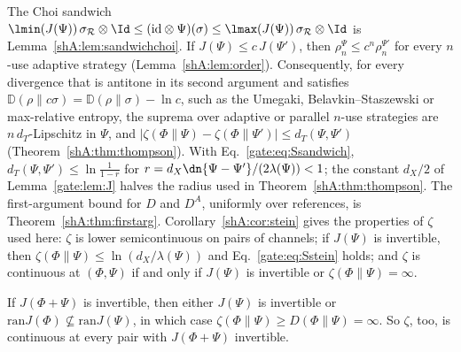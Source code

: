 The Choi sandwich $\lmin(J(\Psi))\,\sigma_{\mathcal R}\otimes\Id\le(\mathrm{id}\otimes\Psi)(\sigma)\le\lmax(J(\Psi))\,\sigma_{\mathcal R}\otimes\Id$ is Lemma~\ref{shA:lem:sandwichchoi}. If $J(\Psi)\le c\,J(\Psi')$, then $\rho^\Psi_n\le c^n\rho^{\Psi'}_n$ for every $n$-use adaptive strategy (Lemma~\ref{shA:lem:order}). Consequently, for every divergence that is antitone in its second argument and satisfies $\mathbb D(\rho\|c\sigma)=\mathbb D(\rho\|\sigma)-\ln c$, such as the Umegaki, Belavkin--Staszewski or max-relative entropy, the suprema over adaptive or parallel $n$-use strategies are $n\,d_T$-Lipschitz in $\Psi$, and $|\zeta(\Phi\|\Psi)-\zeta(\Phi\|\Psi')|\le d_T(\Psi,\Psi')$ (Theorem~\ref{shA:thm:thompson}). With Eq.~\eqref{gate:eq:Ssandwich}, $d_T(\Psi,\Psi')\le\ln\frac1{1-r}$ for $r=d_X\dn{\Psi-\Psi'}/(2\lambda(\Psi))<1$; the constant $d_X/2$ of Lemma~\ref{gate:lem:J} halves the radius used in Theorem~\ref{shA:thm:thompson}. The first-argument bound for $D$ and $D^A$, uniformly over references, is Theorem~\ref{shA:thm:firstarg}. Corollary~\ref{shA:cor:stein} gives the properties of $\zeta$ used here: $\zeta$ is lower semicontinuous on pairs of channels; if $J(\Psi)$ is invertible, then $\zeta(\Phi\|\Psi)\le\ln(d_X/\lambda(\Psi))$ and Eq.~\eqref{gate:eq:Sstein} holds; and $\zeta$ is continuous at $(\Phi,\Psi)$ if and only if $J(\Psi)$ is invertible or $\zeta(\Phi\|\Psi)=\infty$.

\begin{remark}\label{gate:smp:rem:zeta}%
If $J(\Phi+\Psi)$ is invertible, then either $J(\Psi)$ is invertible or $\mathrm{ran}J(\Phi)\not\subseteq\mathrm{ran}J(\Psi)$, in which case $\zeta(\Phi\|\Psi)\ge D(\Phi\|\Psi)=\infty$. So $\zeta$, too, is continuous at every pair with $J(\Phi+\Psi)$ invertible.
\end{remark}

